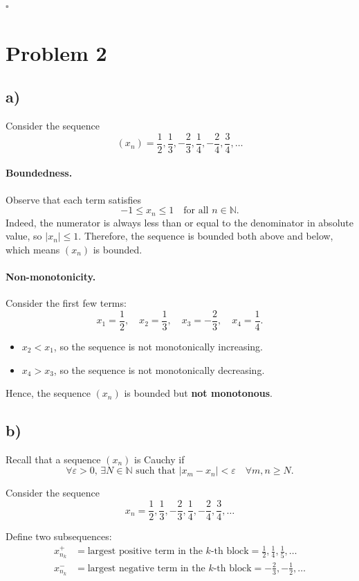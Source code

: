 \documentclass[12pt]{article}
\begin{document}
\hfill $\square$

\section*{Problem 2}
\subsection*{a)}
Consider the sequence
\[
	(x_n) = \frac{1}{2}, \frac{1}{3}, -\frac{2}{3}, \frac{1}{4}, -\frac{2}{4}, \frac{3}{4}, \dots
\]

\paragraph{Boundedness.} Observe that each term satisfies
\[
	-1 \le x_n \le 1 \quad \text{for all } n \in \mathbb{N}.
\]
Indeed, the numerator is always less than or equal to the denominator in absolute value, so $|x_n| \le 1$. Therefore, the sequence is bounded both above and below, which means $(x_n)$ is bounded.

\paragraph{Non-monotonicity.} Consider the first few terms:
\[
	x_1 = \frac{1}{2}, \quad x_2 = \frac{1}{3}, \quad x_3 = -\frac{2}{3}, \quad x_4 = \frac{1}{4}.
\]
\begin{itemize}
	\item $x_2 < x_1$, so the sequence is not monotonically increasing.
	\item $x_4 > x_3$, so the sequence is not monotonically decreasing.
\end{itemize}

Hence, the sequence $(x_n)$ is bounded but \textbf{not monotonous}.

\subsection*{b)}
Recall that a sequence $(x_n)$ is Cauchy if
\[
	\forall \varepsilon > 0, \, \exists N \in \mathbb{N} \text{ such that } |x_m - x_n| < \varepsilon \quad \forall m,n \ge N.
\]

Consider the sequence
\[
	x_n = \frac{1}{2}, \frac{1}{3}, -\frac{2}{3}, \frac{1}{4}, -\frac{2}{4}, \frac{3}{4}, \dots
\]

Define two subsequences:
\begin{align*}
	x_{n_k}^{+} & = \text{largest positive term in the $k$-th block} = \frac{1}{2}, \frac{1}{4}, \frac{1}{5}, \dots \\
	x_{n_k}^{-} & = \text{largest negative term in the $k$-th block} = -\frac{2}{3}, -\frac{1}{2}, \dots
\end{align*}
\end{document}

